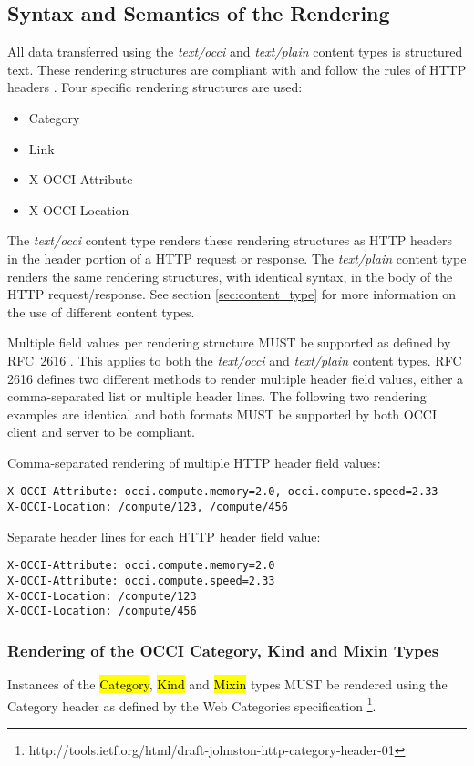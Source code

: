 \documentclass[10pt,a4paper]{article}
\begin{document}
\subsection{Syntax and Semantics of the Rendering}
\label{sec:syntax}
All data transferred using the \textit{text/occi} and
\textit{text/plain} content types is structured text. These rendering structures 
are compliant with and follow the rules of HTTP headers \cite{rfc2616}. 
Four specific rendering structures are used:

\begin{itemize}
  \item Category
  \item Link
  \item X-OCCI-Attribute
  \item X-OCCI-Location
\end{itemize}

The \textit{text/occi} content type renders these rendering structures as HTTP
headers in the header portion of a HTTP request or response. The
\textit{text/plain} content type renders the same rendering structures, with
identical syntax, in the body of the HTTP request/response. See
section \ref{sec:content_type} for more information on the use of
different content types.

Multiple field values per rendering structure MUST be supported as defined by
RFC~2616 \cite{rfc2616}. This applies to both the \textit{text/occi}
and \textit{text/plain} content types. RFC 2616 defines two different
methods to render multiple header field values, either a
comma-separated list or multiple header lines. The following two
rendering examples are identical and both formats MUST be supported by
both OCCI client and server to be compliant.

Comma-separated rendering of multiple HTTP header field values:
\begin{verbatim}
X-OCCI-Attribute: occi.compute.memory=2.0, occi.compute.speed=2.33
X-OCCI-Location: /compute/123, /compute/456
\end{verbatim}

Separate header lines for each HTTP header field value:
\begin{verbatim}
X-OCCI-Attribute: occi.compute.memory=2.0
X-OCCI-Attribute: occi.compute.speed=2.33
X-OCCI-Location: /compute/123
X-OCCI-Location: /compute/456
\end{verbatim}

\subsubsection{Rendering of the OCCI Category, Kind and Mixin Types}
\label{sec:render_cats}
Instances of the \hl{Category}, \hl{Kind} and \hl{Mixin} types
\cite{occi:core} MUST be rendered using the Category header as defined
by the Web Categories specification%
\footnote{http://tools.ietf.org/html/draft-johnston-http-category-header-01}.
\end{document}
